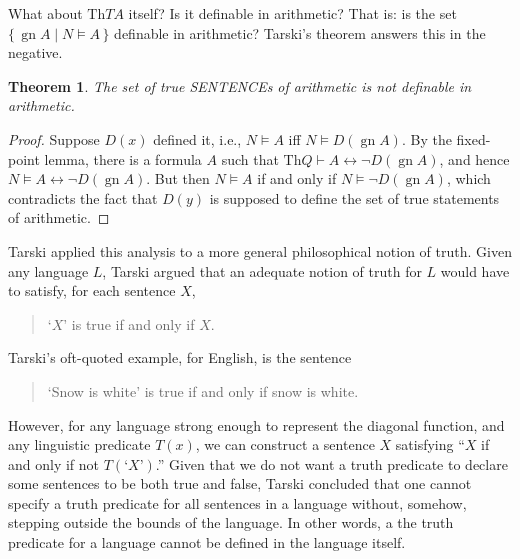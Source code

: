 \documentclass[10pt,a4paper]{article}
\newcommand*{\olup}[1]{\MakeUppercase{#1}}
\theoremstyle{plain}
\newtheorem{thm}{Theorem}[section]
\theoremstyle{definition}
\theoremstyle{remark}
\newcommand*{\ollabel}[1]{\label{#1}}
\providecommand{\Proves}{\mathrel{\vdash}}
\providecommand{\Sat}[2]{\ensuremath{#1 \models #2}}
\providecommand{\Th}{\ensuremath{\mathrm{Th}}}
\providecommand{\Setabs}[2]{\{\, #1 \mid #2 \,\}}
\providecommand{\Gn}{\operatorname{gn}}
\providecommand{\gn}{\operatorname{gn}}
\providecommand{\liff}{\mathbin{\leftrightarrow}}
\begin{document}
What about $\Th{TA}$ itself? Is it definable in arithmetic? That
is: is the set $\Setabs{\Gn{A}}{\Sat{N}{A}}$ definable in
arithmetic? Tarski's theorem answers this in the negative.

\begin{thm}
\ollabel{thm:tarski}
The set of true \olup{sentence}s of arithmetic is not definable in arithmetic.
\end{thm}

\begin{proof} 
Suppose $D(x)$ defined it, i.e., $\Sat{N}{A}$ iff
$\Sat{N}{D(\gn{A})}$. By the fixed-point lemma, there is a formula
$A$ such that $\Th{Q} \Proves A \liff \lnot D(\gn{A})$, and hence
$\Sat{N}{A \liff \lnot D(\gn{A})}$. But then $\Sat{N}{A}$ if and
only if $\Sat{N}{\lnot D(\gn{A})}$, which contradicts the fact that
$D(y)$ is supposed to define the set of true statements of
arithmetic.  
\end{proof}

Tarski applied this analysis to a more general philosophical notion of
truth. Given any language $L$, Tarski argued that an adequate notion
of truth for $L$ would have to satisfy, for each sentence $X$,
\begin{quote}
`$X$' is true if and only if $X$.
\end{quote}
Tarski's oft-quoted example, for English, is the sentence
\begin{quote}
`Snow is white' is true if and only if snow is white.
\end{quote}
However, for any language strong enough to represent the diagonal
function, and any linguistic predicate $T(x)$, we can construct a
sentence $X$ satisfying ``$X$ if and only if not $T(\text{`$X$'})$.''
Given that we do not want a truth predicate to declare some sentences
to be both true and false, Tarski concluded that one cannot specify a
truth predicate for all sentences in a language without, somehow,
stepping outside the bounds of the language. In other words, a the
truth predicate for a language cannot be defined in the language
itself.
\end{document}
